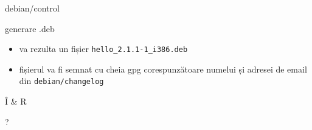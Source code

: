 \documentclass{beamer}
\begin{document}
\begin{frame}{debian/control}
  \begin{beamerboxesrounded}[lower=block body,shadow=true]{}
    \small 
  \end{beamerboxesrounded}
\end{frame}

\begin{frame}{generare .deb}
  \begin{itemize}
  \begin{beamerboxesrounded}[lower=block body,shadow=true]{}
    debuild
  \end{beamerboxesrounded}
  \item va rezulta un fișier \texttt{hello\_2.1.1-1\_i386.deb}
  \item fișierul va fi semnat cu cheia gpg corespunzătoare numelui și 
    adresei de email din \texttt{debian/changelog}
  \end{itemize}
\end{frame}

\begin{frame}{Î \& R}
  \begin{centering}
    \Huge ?    \par
  \end{centering}
\end{frame}
\end{document}
